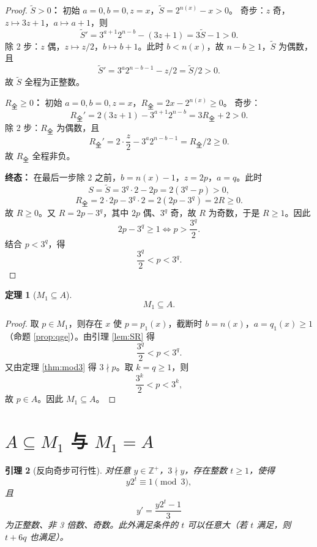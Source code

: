 \documentclass[11pt]{article}
\newtheorem{theorem}{定理}[section]
\newtheorem{lemma}[theorem]{引理}
\theoremstyle{definition}
\theoremstyle{definition}
\theoremstyle{remark}
\begin{document}
\begin{proof}
\textbf{\(\tilde S>0\)：}
初始 \(a=0,b=0,z=x\)，\(\tilde S=2^{n(x)}-x>0\)。
奇步：\(z\) 奇，\(z\mapsto3z+1\)，\(a\mapsto a+1\)，则
\[
\tilde S'=3^{a+1}2^{n-b}-(3z+1)=3\tilde S-1>0.
\]
除 2 步：\(z\) 偶，\(z\mapsto z/2\)，\(b\mapsto b+1\)。此时 \(b<n(x)\)，故 \(n-b\ge1\)，\(\tilde S\) 为偶数，且
\[
\tilde S'=3^a2^{n-b-1}-z/2=\tilde S/2>0.
\]
故 \(\tilde S\) 全程为正整数。

\textbf{\(R_{\text{全}}\ge0\)：}
初始 \(a=0,b=0,z=x\)，\(R_{\text{全}}=2x-2^{n(x)}\ge0\)。
奇步：
\[
R_{\text{全}}'=2(3z+1)-3^{a+1}2^{n-b}=3R_{\text{全}}+2>0.
\]
除 2 步：\(R_{\text{全}}\) 为偶数，且
\[
R_{\text{全}}'=2\cdot\frac z2-3^a2^{n-b-1}=R_{\text{全}}/2\ge0.
\]
故 \(R_{\text{全}}\) 全程非负。

\textbf{终态：}
在最后一步除 2 之前，\(b=n(x)-1\)，\(z=2p\)，\(a=q\)。此时
\[
S=\tilde S=3^q\cdot2-2p=2(3^q-p)>0,
\]
\[
R_{\text{全}}=2\cdot2p-3^q\cdot2=2(2p-3^q)=2R\ge0.
\]
故 \(R\ge0\)。又 \(R=2p-3^q\)，其中 \(2p\) 偶、\(3^q\) 奇，故 \(R\) 为奇数，于是 \(R\ge1\)。因此
\[
2p-3^q\ge1\iff p>\frac{3^q}{2}.
\]
结合 \(p<3^q\)，得
\[
\frac{3^q}{2}<p<3^q.
\]
\end{proof}

\begin{theorem}[\(M_1\subseteq A\)]\label{thm:M1subA}
\[
M_1\subseteq A.
\]
\end{theorem}

\begin{proof}
取 \(p\in M_1\)，则存在 \(x\) 使 \(p=p_1(x)\)，截断时 \(b=n(x)\)，\(a=q_1(x)\ge1\)（命题 \ref{prop:qge}）。由引理 \ref{lem:SR} 得
\[
\frac{3^q}{2}<p<3^q .
\]
又由定理 \ref{thm:mod3} 得 \(3\nmid p\)。取 \(k=q\ge1\)，则
\[
\frac{3^k}{2}<p<3^k,
\]
故 \(p\in A\)。因此 \(M_1\subseteq A\)。
\end{proof}

\section{\(A\subseteq M_1\) 与 \(M_1=A\)}

\begin{lemma}[反向奇步可行性]\label{lem:reverse}
对任意 \(y\in\mathbb Z^+\)，\(3\nmid y\)，存在整数 \(t\ge1\)，使得
\[
y2^t\equiv1\pmod3,
\]
且
\[
y'=\frac{y2^t-1}{3}
\]
为正整数、非 3 倍数、奇数。此外满足条件的 \(t\) 可以任意大（若 \(t\) 满足，则 \(t+6q\) 也满足）。
\end{lemma}
\end{document}
